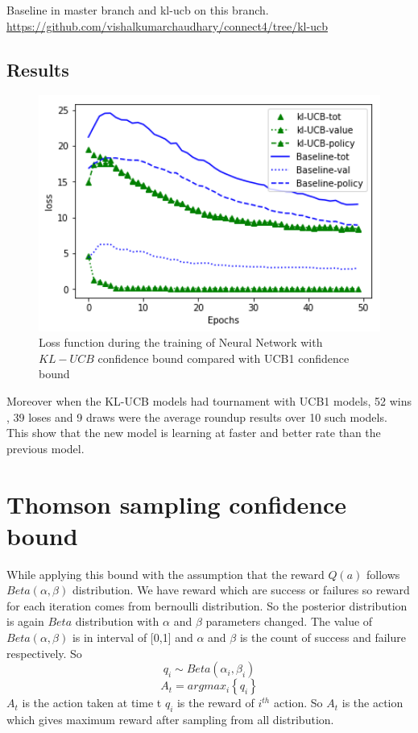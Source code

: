 Baseline in master branch and kl-ucb on this branch.\\
\url{https://github.com/vishalkumarchaudhary/connect4/tree/kl-ucb}

\subsection{Results}

\begin{figure}
 	[!htb]\centering
    \includegraphics[width=6in]{images/kl-ucbVSbaseline.png}
    \caption{Loss function during the training of Neural Network with $KL-UCB$ confidence bound compared with UCB1 confidence bound}
  \label{fig:phase}
  \end{figure}

Moreover when the KL-UCB models had tournament with UCB1 models, 52 wins , 39 loses and 9 draws were the average roundup  results over 10 such models. This show that the new model is learning at faster and better rate than the previous model.

\clearpage
\section{Thomson sampling confidence bound}
While applying this bound with the assumption that the reward $Q(a)$ follows $Beta(\alpha,\beta)$ distribution. We have reward which are success or failures so reward for each iteration comes from bernoulli distribution. So the posterior distribution is again $Beta$ distribution with $\alpha$ and $\beta$ parameters changed. The value of $Beta(\alpha,\beta)$ is in interval of [0,1] and $\alpha$ and $\beta$ is the count of success and failure respectively. So
$$ q_{i} \sim Beta(\alpha_{i},\beta_{i}) $$
$$ A_{t} = argmax_{i}\left \lbrace q_{i} \right \rbrace $$
$A_{t}$ is the action taken at time t $q_{i}$ is the reward of $i^{th}$ action. So $A_{t}$ is the action which gives maximum reward after sampling from all distribution.

